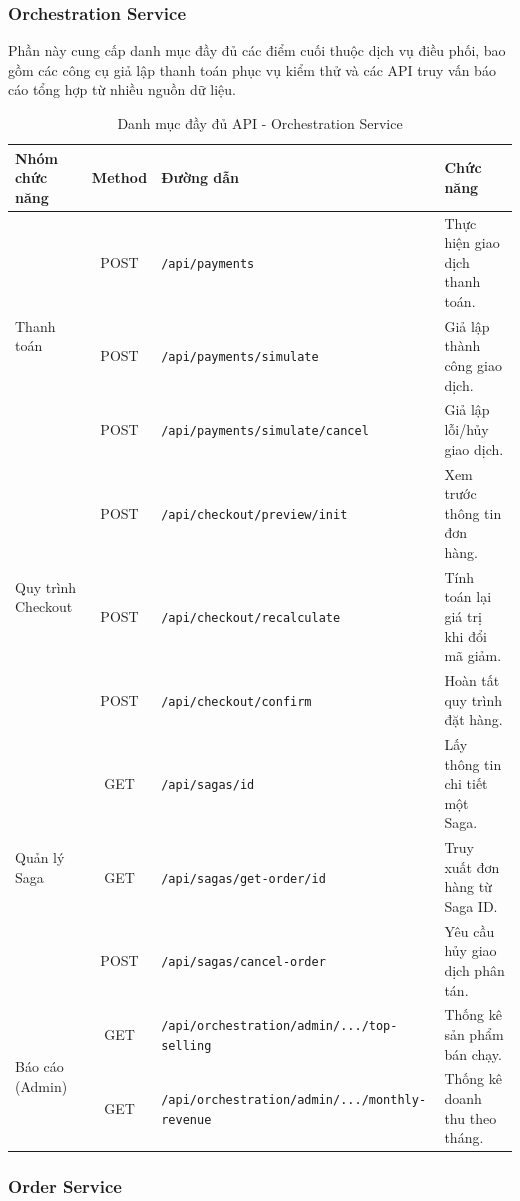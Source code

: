 \subsubsection*{Orchestration Service}

Phần này cung cấp danh mục đầy đủ các điểm cuối thuộc dịch vụ điều phối, bao gồm các công cụ giả lập thanh toán phục vụ kiểm thử và các API truy vấn báo cáo tổng hợp từ nhiều nguồn dữ liệu.

\begin{table}[H]
\centering
\caption{Danh mục đầy đủ API - Orchestration Service}
\label{tab:full_orchestration_api_appendix}
\begin{tabular}{|l|c|l|l|}
\hline
\textbf{Nhóm chức năng} & \textbf{Method} & \textbf{Đường dẫn} & \textbf{Chức năng} \\ \hline
\multirow{3}{*}{Thanh toán} & POST & \texttt{/api/payments} & Thực hiện giao dịch thanh toán. \\ \cline{2-4}
& POST & \texttt{/api/payments/simulate} & Giả lập thành công giao dịch. \\ \cline{2-4}
& POST & \texttt{/api/payments/simulate/cancel} & Giả lập lỗi/hủy giao dịch. \\ \hline
\multirow{3}{*}{Quy trình Checkout} & POST & \texttt{/api/checkout/preview/init} & Xem trước thông tin đơn hàng. \\ \cline{2-4}
& POST & \texttt{/api/checkout/recalculate} & Tính toán lại giá trị khi đổi mã giảm. \\ \cline{2-4}
& POST & \texttt{/api/checkout/confirm} & Hoàn tất quy trình đặt hàng. \\ \hline
\multirow{3}{*}{Quản lý Saga} & GET & \texttt{/api/sagas/{id}} & Lấy thông tin chi tiết một Saga. \\ \cline{2-4}
& GET & \texttt{/api/sagas/get-order/{id}} & Truy xuất đơn hàng từ Saga ID. \\ \cline{2-4}
& POST & \texttt{/api/sagas/cancel-order} & Yêu cầu hủy giao dịch phân tán. \\ \hline
\multirow{2}{*}{Báo cáo (Admin)} & GET & \texttt{/api/orchestration/admin/.../top-selling} & Thống kê sản phẩm bán chạy. \\ \cline{2-4}
& GET & \texttt{/api/orchestration/admin/.../monthly-revenue} & Thống kê doanh thu theo tháng. \\ \hline
\end{tabular}
\end{table}

\subsubsection*{Order Service}

